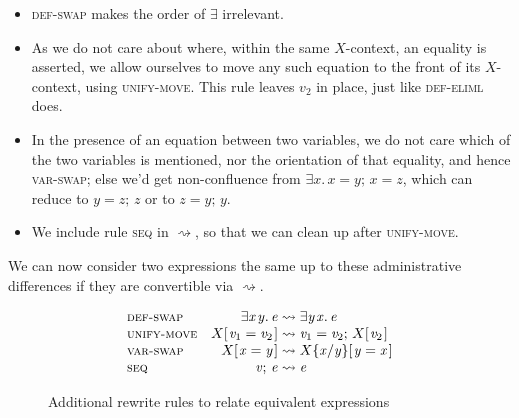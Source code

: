\documentclass[acmsmall,review,dvipsnames]{acmart}
\newcommand{\Varid}[1]{\mathit{#1}}
\newcommand{\rulename}[1]{\textsc{\small #1}}
\newcommand{\subst}[3]{#1\{#3/#2\}}
\newcommand{\movestoX}{\rightsquigarrow}
\begin{document}
\begin{itemize}
\item \rulename{def-swap} makes the order of \ensuremath{\exists} irrelevant.
\item As we do not care about where, within the same $X$-context, an equality is asserted, we allow ourselves to move any such equation to the front of its $X$-context, using \rulename{unify-move}. This rule leaves $v_2$ in place, just like \rulename{def-eliml} does.
\item In the presence of an equation between two variables, we do not care which of the two variables is mentioned, nor the orientation of that equality, and hence \rulename{var-swap}; else we’d get non-confluence from \ensuremath{\exists\Varid{x}.\,\Varid{x}\mathrel{=}\Varid{y};\,\Varid{x}\mathrel{=}\Varid{z}}, which can reduce to \ensuremath{\Varid{y}\mathrel{=}\Varid{z};\,\Varid{z}} or to \ensuremath{\Varid{z}\mathrel{=}\Varid{y};\,\Varid{y}}.
\item We include rule \rulename{seq} in $\movestoX$, so that we can clean up after \rulename{unify-move}.
\end{itemize}
We can now consider two expressions the same up to these administrative differences if they are convertible via \ensuremath{\movestoX}.

\begin{figure}
\setlength{\abovedisplayskip}{0pt}%
\setlength{\belowdisplayskip}{0pt}%
\[\begin{array}{lr@{\;}c@{\;}l}
    \rulename{def-swap} & \ensuremath{\exists\Varid{x}\hspace{0.3mm}\Varid{y}.\,\Varid{e}} & \movestoX & \ensuremath{\exists\Varid{y}\hspace{0.3mm}\Varid{x}.\,\Varid{e}}\\
    \rulename{unify-move} & \ensuremath{X [\mskip1.5mu \Varid{v}_{\mathrm{1}}\mathrel{=}\Varid{v}_{\mathrm{2}}\mskip1.5mu]} & \movestoX & \ensuremath{\Varid{v}_{\mathrm{1}}\mathrel{=}\Varid{v}_{\mathrm{2}};\,X [\mskip1.5mu \Varid{v}_{\mathrm{2}}\mskip1.5mu]} \\
    \rulename{var-swap} & \ensuremath{X [\mskip1.5mu \Varid{x}\mathrel{=}\Varid{y}\mskip1.5mu]} & \movestoX & \ensuremath{\subst{X}{\Varid{y}}{\Varid{x}} [\mskip1.5mu \Varid{y}\mathrel{=}\Varid{x}\mskip1.5mu]} \\
    \rulename{seq} & \ensuremath{\Varid{v};\,\Varid{e}} & \movestoX & \ensuremath{\Varid{e}} \\
\end{array}\]
  \caption{Additional rewrite rules to relate equivalent expressions}
    \label{fig:rules-confluence}
\end{figure}
\end{document}
